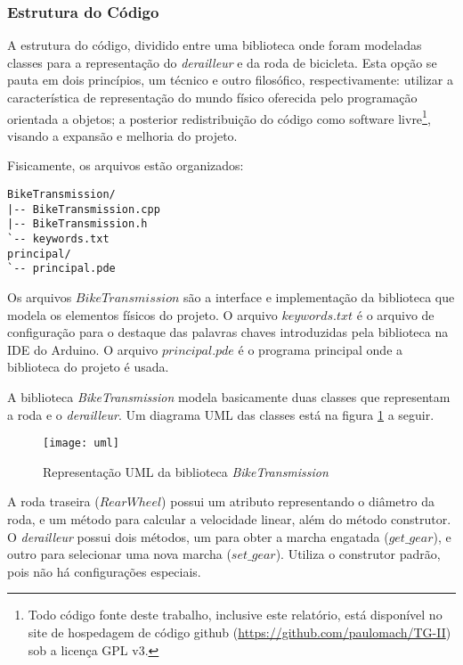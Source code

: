 \documentclass[a4paper,11pt]{article}
\begin{document}
\subsubsection{Estrutura do Código}
\label{sec:implemt}

A estrutura do código, dividido entre uma biblioteca onde foram modeladas
classes para a representação do \textit{derailleur} e da roda de bicicleta. Esta
opção se pauta em dois princípios, um técnico e outro filosófico,
respectivamente: utilizar a característica de representação do mundo físico
oferecida pelo programação orientada a objetos; a posterior redistribuição do
código como software livre\footnote{Todo código fonte deste trabalho, inclusive
este relatório, está disponível no site de hospedagem de código github
(\url{https://github.com/paulomach/TG-II}) sob a licença GPL v3\cite{gpl}.},
visando a expansão e melhoria do projeto.

Fisicamente, os arquivos estão organizados:

\begin{verbatim}
BikeTransmission/
|-- BikeTransmission.cpp
|-- BikeTransmission.h
`-- keywords.txt
principal/
`-- principal.pde
\end{verbatim}

Os arquivos $BikeTransmission$ são a interface e implementação da biblioteca
que modela os elementos físicos do projeto. O arquivo $keywords.txt$ é o arquivo
de configuração para o destaque das palavras chaves introduzidas pela biblioteca
na IDE do Arduino. O arquivo $principal.pde$ é o programa principal onde a
biblioteca do projeto é usada.

A biblioteca \textit{BikeTransmission} modela basicamente duas classes que
representam a roda e o \textit{derailleur}. Um diagrama UML das classes está na
figura \ref{fig:uml} a seguir.

\begin{figure}[h!]
\begin{center}
  \texttt{[image: uml]}
\end{center}
  \caption{Representação UML da biblioteca \textit{BikeTransmission}}
  \label{fig:uml}
\end{figure}

A roda traseira ($RearWheel$) possui um atributo representando o diâmetro da
roda, e um método para calcular a velocidade linear, além do método construtor.
O \textit{derailleur} possui dois métodos, um para obter a marcha engatada
($get\_gear$), e outro para selecionar uma nova marcha ($set\_gear$). Utiliza o
construtor padrão, pois não há configurações especiais.
\end{document}
